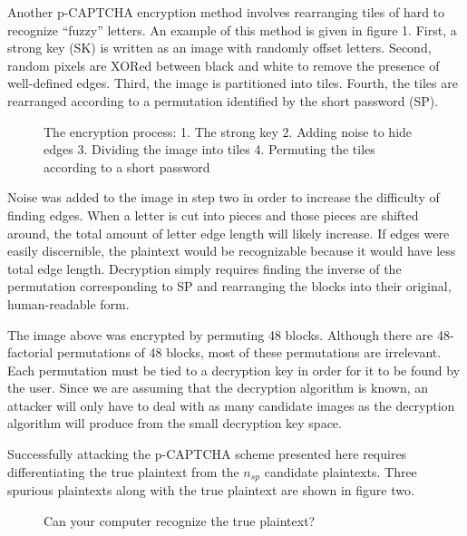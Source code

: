 \documentclass[12pt]{article}
\begin{document}
	Another p-CAPTCHA encryption method involves rearranging tiles of hard to recognize “fuzzy” letters. An example of this method is given in figure 1. First, a strong key (SK) is written as an image with randomly offset letters. Second, random pixels are XORed between black and white to remove the presence of well-defined edges. Third, the image is partitioned into tiles. Fourth, the tiles are rearranged according to a permutation identified by the short password (SP).

\begin{figure}
	\centering	
	\caption{The encryption process: 1. The strong key 2. Adding noise to hide edges 3. Dividing the image into tiles 4. Permuting the tiles according to a short password}
	\label{fig:EncryptionProcess}
\end{figure}

	Noise was added to the image in step two in order to increase the difficulty of finding edges. When a letter is cut into pieces and those pieces are shifted around, the total amount of letter edge length will likely increase. If edges were easily discernible, the plaintext would be recognizable because it would have less total edge length. Decryption simply requires finding the inverse of the permutation corresponding to SP and rearranging the blocks into their original, human-readable form.

	The image above was encrypted by permuting 48 blocks. Although there are 48-factorial permutations of 48 blocks, most of these permutations are irrelevant. Each permutation must be tied to a decryption key in order for it to be found by the user. Since we are assuming that the decryption algorithm is known, an attacker will only have to deal with as many candidate images as the decryption algorithm will produce from the small decryption key space.

	Successfully attacking the p-CAPTCHA scheme presented here requires differentiating the true plaintext from the $n_{sp}$ candidate plaintexts. Three spurious plaintexts along with the true plaintext are shown in figure two.

\begin{figure}
	\centering	
	\caption{Can your computer recognize the true plaintext?}
	\label{fig:RecognitionProblem}
\end{figure}
\end{document}

